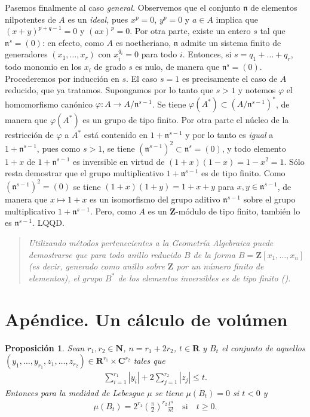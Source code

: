 \documentclass[bibtotoc,leqno,spanish]{amsbook}
\newcommand{\RR}{\mathbf{R}}
\newcommand{\ZZ}{\mathbf{Z}}
\newcommand{\NN}{\mathbf{N}}
\newcommand{\CC}{\mathbf{C}}
\newcommand{\idl}[1]{\mathfrak{#1}}
\newcommand{\QED}{LQQD.}
\newcommand{\abs}[1]{\left\lvert#1\right\rvert}
\renewcommand{\to}[1][]{\xrightarrow{#1}}
\numberwithin{equation}{section}
\newenvironment{comm}%
	{\begin{quotation}\itshape}
	{\end{quotation}}
\theoremstyle{note}
\theoremstyle{note}
\newtheorem*{proposition*}{Proposici\'on}
\theoremstyle{rem}
\numberwithin{theorem}{section}
\numberwithin{proposition}{section}
\numberwithin{definition}{section}
\numberwithin{lemma}{section}
\numberwithin{corollary}{section}
\numberwithin{example}{section}
\numberwithin{footnote}{section}%
\begin{document}
Pasemos finalmente al caso {\em general.} Observemos que el conjunto $\idl{n}$ de elementos nilpotentes de $A$
es un {\em ideal,} pues $x^{p}=0$, $y^{p}=0$ y $a\in A$ implica que $(x+y)^{p+q-1}=0$ y $(ax)^{p}=0$. Por otra parte,
existe un entero $s$ tal que $\idl{n}^{s}=(0)$: en efecto, como $A$ es noetheriano, $\idl{n}$ admite un sistema
finito de generadores $(x_{1},\dots,x_{r})$ con $x_{i}^{q_{i}}=0$ para todo $i$. Entonces, si $s = q_{1}+\dots+q_{r}$,
todo monomio en los $x_{i}$ de grado $s$ es nulo, de manera que $\idl{n}^{s}=(0)$. Procederemos por inducci\'on
en $s$. El caso $s=1$ es precisamente el caso de $A$ reducido, que ya tratamos. Supongamos por lo tanto que
$s>1$ y notemos $\varphi$ el homomorfismo can\'onico $\varphi:A\to A/\idl{n}^{s-1}$. Se tiene
$\varphi(A^{*})\subset(A/\idl{n}^{s-1})^{*}$, de manera que $\varphi(A^{*})$ es un grupo de tipo finito. Por
otra parte el n\'ucleo de la restricci\'on de $\varphi$ a $A^{*}$ est\'a contenido en $1+\idl{n}^{s-1}$ y
por lo tanto es {\em igual} a $1+\idl{n}^{s-1}$, pues como $s>1$, se tiene $(\idl{n}^{s-1})^{2}\subset\idl{n}^{s}=(0)$,
y todo elemento $1+x$ de $1+\idl{n}^{s-1}$ es inversible en virtud de
$(1+x)(1-x) = 1-x^{2}=1$. S\'olo resta demostrar que el grupo multiplicativo $1+\idl{n}^{s-1}$ es de tipo finito.
Como $(\idl{n}^{s-1})^{2}=(0)$ se tiene $(1+x)(1+y) = 1+x+y$ para $x,y\in\idl{n}^{s-1}$, de manera que
$x\mapsto 1+x$ es un isomorfismo del grupo aditivo $\idl{n}^{s-1}$ sobre el grupo multiplicativo $1+\idl{n}^{s-1}$.
Pero, como $A$ es un $\ZZ$-m\'odulo de tipo finito, tambi\'en lo es $\idl{n}^{s-1}$. \QED

\begin{comm}
Utilizando m\'etodos pertenecientes a la Geometr\'ia Algebraica puede demostrarse que para todo anillo
{\em reducido} $B$ de la forma $B = \ZZ[x_{1},\dots,x_{n}]$ (es decir, generado como anillo sobre $\ZZ$ por un
n\'umero finito de elementos), el grupo $B^{*}$ de los elementos inversibles es de tipo finito (\cite{Samuel1}).
\end{comm}

\section*[Un c\'alculo de vol\'umen]{Ap\'endice. Un c\'alculo de vol\'umen}

\begin{proposition*}
Sean $r_{1},r_{2}\in\NN$, $n=r_{1}+2r_{2}$, $t\in\RR$ y $B_{t}$ el conjunto de aquellos
$(y_{1},\dots,y_{r_{1}},z_{1},\dots,z_{r_{2}})\in\RR^{r_{1}}\times\CC^{r_{2}}$ tales que
\begin{gather}
\sum_{i=1}^{r_{1}}\abs{y_{i}}+2\sum_{j=1}^{r_{2}}\abs{z_{j}}\leq t.
\end{gather}
Entonces para la medidad de Lebesgue $\mu$ se tiene $\mu(B_{t})=0$ si $t < 0$ y
\begin{gather}\label{eq-4-ap-2}
\mu(B_{t}) = 2^{r_{1}}\left(\frac{\pi}{2}\right)^{r_{2}}\frac{t^{n}}{n!}\quad\text{si}\quad t\geq 0.
\end{gather}
\end{proposition*}
\end{document}
